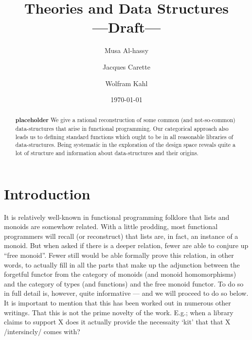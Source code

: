 \documentclass[acmsmall,review,anonymous,prologue,dvipsnames]{acmart}
\date{\today}
\title{Theories and Data Structures\\\medskip
\large ---Draft---}
\begin{document}
\maketitle

\def\edcomm#1#2{ \fbox{\textbf{Comment: #1 }} #2 \fbox{\textbf{End Comment}}}

\author{Musa Al-hassy}
\author{Jacques Carette}
\author{Wolfram Kahl}

\begin{abstract}


\textbf{placeholder} We give a rational reconstruction of some common (and
not-so-common) data-structures that arise in functional
programming. Our categorical approach also leads us to defining
standard functions which ought to be in all reasonable libraries of
data-structures. Being systematic in the exploration of the design
space reveals quite a lot of structure and information about
data-structures and their origins.

\end{abstract}

\section{Introduction}
\label{sec:intro}

It is relatively well-known in functional programming folklore that lists and monoids
are somewhow related. With a little prodding, most functional programmers will recall
(or reconstruct) that lists are, in fact, an instance of a monoid. But when asked if there
is a deeper relation, fewer are able to conjure up ``free
monoid''. Fewer still would be able formally prove this relation, in
other words, to actually fill in all the parts
that make up the adjunction between the forgetful functor from the category of monoids (and
monoid homomorphisms) and the category of types (and functions) and
the free monoid functor. To do so in full detail is, however, quite
informative --- and we will proceed to do so below.
\edcomm{MA}{ It is important to mention that this has been worked out in
numerous other writings. That this is not the prime novelty of the work. E.g.;
when a library claims to support X does it actually provide the necessaity
‘kit’ that that X /intersincly/ comes with?}
\end{document}
